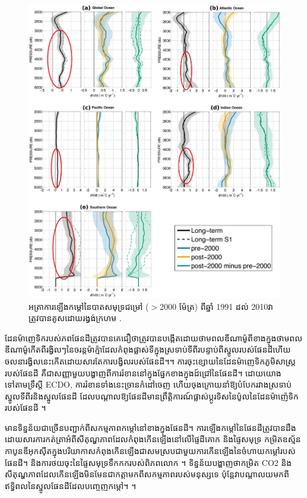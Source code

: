 \documentclass[10pt,twocolumn,letterpaper]{article}
\begin{document}
\begin{figure}[t]
\begin{center}
   \includegraphics[width=1\linewidth]{ocean-highlight.jpg}
\end{center}
   \caption{អត្រាការឡើងកម្តៅនៃបាតសមុទ្រជម្រៅ ($>$2000 ម៉ែត្រ) ពីឆ្នាំ 1991 ដល់ 2010​វាត្រូវបានគូសដោយរង្វង់ក្រហម \cite{132}.}
\label{fig:15}
\label{fig:onecol}
\end{figure}

ដែនម៉ាញេទិករបស់ភពផែនដីត្រូវបានគេជឿថាត្រូវបានបង្កើតដោយថាមពលឌីណាម៉ូពីខាងក្នុង​ថាមពលឌីណាម៉ូកើតពីរង្វិលៗនៃចរន្តម៉ាក្ម៉ាដែលកំពុងផ្លាស់ទីក្នុងស្រទាប់ទីពីរបន្ទាប់ពីស្នូលរបស់ផែនដីហើយចលនារង្វិលនេះកើតដោយសារតែការបង្វិលរបស់ផែនដី។\cite{123}។ ការចុះខ្សោយនៃដែនម៉ាញេទិកភូមិសាស្ត្ររបស់ផែនដី គឺជាសញ្ញាមួយបង្ហាញពីការរំខាននៅក្នុងផ្នែកខាងក្នុងដ៍ជ្រៅនៃផែនដី។ ដោយយោងទៅតាមទ្រឹស្តី ECDO, ការរំខានទាំងនេះច្រានកំដៅចេញ ហើយចុងក្រោយនាំឱ្យបំបែករវាងស្រទាប់ស្នូលទីពីរ​និងស្នូលផែនដី ដែលបណ្ដាលឱ្យផែនដីមានព្រឹត្តិការណ៍ផ្លាស់ប្តូរទិសនៃប៉ូលនៃដែនម៉ាញ៉េទិករបស់ផែនដី \cite{1}។

មានទិន្នន័យជាច្រើនបញ្ជាក់ពីសកម្មភាពកម្ដៅនៅខាងក្នុងផែនដី។ ការឡើងកម្តៅនៃផែនដីត្រូវបានដឹងដោយសារការកត់ត្រាអំពីសីតុណ្ហភាពដែលកំពុងកើនឡើងនៅលើផ្ទៃដីគោក និងផ្ទៃសមុទ្រ\cite{127,128} កម្រិតឧស្ម័នកាបូនឌីអុកស៊ីតក្នុងបរិយាកាសកំពុងកើនឡើងជាសមស្របជាមួយការកើនឡើងនៃចំហាយកម្ដៅរបស់ផែនដី។ \cite{129,130} និងការថយចុះនៃផ្ទៃសមុទ្រទឹកកករបស់ពិភពលោក \cite{131}។ ទិន្នន័យបង្ហាញថាកម្រិត CO2 និងសីតុណ្ហភាពដែលកើនឡើងមិនមែនជាកត្តាមកពីសកម្មភាពរបស់មនុស្សទេ ប៉ុន្តែវាបណ្តាលយមកពីឥទ្ធិពលនៃស្នូលផែនដីដែលបញ្ចេញកម្ដៅ។ \cite{129}។
\end{document}
